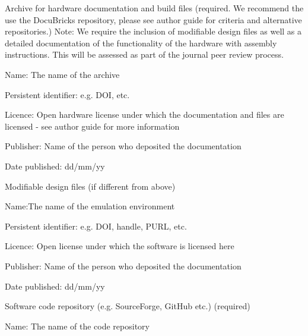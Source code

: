 \documentclass[a4paper]{article}
\begin{document}
Archive for hardware documentation and build files (required.
We recommend the use the DocuBricks repository, please see author guide for criteria and alternative
repositories.) Note: We require the inclusion of modifiable design
files as well as a detailed documentation of the functionality of the
hardware with assembly instructions. This will be assessed as part of
the journal peer review process.

Name: The name of the archive

Persistent identifier: e.g. DOI, etc.

Licence: Open hardware license under which the documentation and
files are licensed - see author guide for more information

Publisher: Name of the person who deposited the documentation

Date published: dd/mm/yy

Modifiable design files (if different from above)

Name:The name of the emulation environment

Persistent identifier: e.g. DOI, handle, PURL, etc.

Licence: Open license under which the software is licensed here

Publisher: Name of the person who deposited the documentation

Date published: dd/mm/yy

Software code repository (e.g. SourceForge, GitHub etc.)
(required)

Name: The name of the code repository
\end{document}
